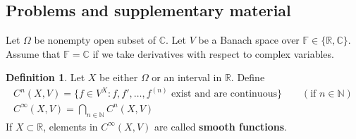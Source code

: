 \documentclass[12pt,b5paper,notitlepage]{article}
\theoremstyle{definition}
\newtheorem{df}{Definition}[section]
\newtheorem{rem}[df]{Remark}
\theoremstyle{plain}
\newcommand{\Cbb}{\mathbb C}
\newcommand{\Nbb}{\mathbb N}
\newcommand{\Rbb}{\mathbb R}
\newcommand{\Fbb}{\mathbb F}
\numberwithin{equation}{section}
\begin{document}
\begin{comment}
\begin{rem}
By induction on $k$, one easily proves
\begin{align}
(z_1+\cdots+z_k)^n=\sum_{j_1+\cdots+j_k=n}{n\choose j_1,\dots,j_k}z_1^{j_1}\cdots z_k^{j_k}
\end{align}
where
\begin{align}
{n\choose j_1,\dots,j_k}=\frac{n!}{j_1!\cdots j_k!}
\end{align}
is the \textbf{multinomial coefficient}. Then, the same method as above proves
\begin{align}
(f_1\cdots f_k)^{(n)}=\sum_{j_1+\cdots+j_k=n}{n\choose j_1,\dots,j_k} f_1^{(j_1)}\cdots f_k^{(j_k)}
\end{align}
\end{rem}
\end{comment}

















\subsection{Problems and supplementary material}


Let $\Omega$ be nonempty open subset of $\Cbb$. Let $V$ be a Banach space over $\Fbb\in\{\Rbb,\Cbb\}$. Assume that $\Fbb=\Cbb$ if we take derivatives with respect to complex variables.


\begin{df}\label{lb354}
Let $X$ be either $\Omega$ or an interval in $\Rbb$. Define  
\begin{gather*}
C^n(X,V)=\{f\in V^X:f,f',\dots,f^{(n)}\text{ exist and are continuous}\}\qquad (\text{if }n\in\Nbb)\\
C^\infty(X,V)=\bigcap_{n\in\Nbb}C^n(X,V)
\end{gather*}
If $X\subset\Rbb$, elements in $C^\infty(X,V)$ are called \textbf{smooth functions}. 
\end{df}
\end{document}
